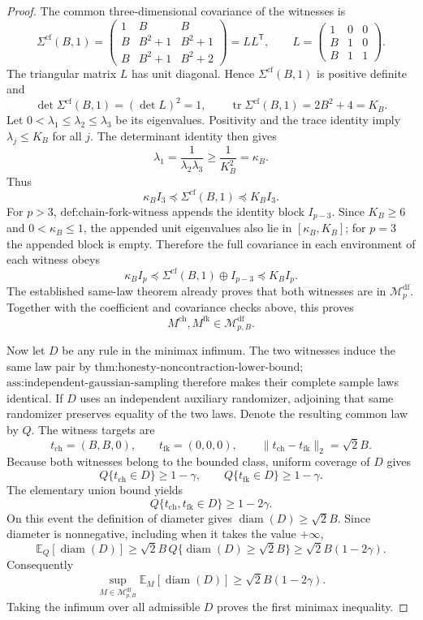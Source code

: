 \documentclass{article}
\begin{document}
\begin{proof}
The common three-dimensional covariance of the witnesses is
\[
\Sigma^{\mathrm{cf}}(B,1)
=
\begin{pmatrix}
1&B&B\\
B&B^2+1&B^2+1\\
B&B^2+1&B^2+2
\end{pmatrix}
=LL^{\mathsf T},
\qquad
L=
\begin{pmatrix}
1&0&0\\
B&1&0\\
B&1&1
\end{pmatrix}.
\]
The triangular matrix \(L\) has unit diagonal.  Hence \(\Sigma^{\mathrm{cf}}(B,1)\) is positive definite and
\[
\det\Sigma^{\mathrm{cf}}(B,1)=(\det L)^2=1,
\qquad
\operatorname{tr}\Sigma^{\mathrm{cf}}(B,1)=2B^2+4=K_B.
\]
Let \(0<\lambda_1\le\lambda_2\le\lambda_3\) be its eigenvalues.  Positivity and the trace identity imply \(\lambda_j\le K_B\) for all \(j\).  The determinant identity then gives
\[
\lambda_1=\frac{1}{\lambda_2\lambda_3}
\ge\frac{1}{K_B^2}=\kappa_B.
\]
Thus
\[
\kappa_B I_3\preceq\Sigma^{\mathrm{cf}}(B,1)
\preceq K_B I_3.
\]
For \(p>3\), \(\text{def:chain-fork-witness}\) appends the identity block \(I_{p-3}\).  Since \(K_B\ge6\) and \(0<\kappa_B\le1\), the appended unit eigenvalues also lie in \([\kappa_B,K_B]\); for \(p=3\) the appended block is empty.  Therefore the full covariance in each environment of each witness obeys
\[
\kappa_B I_p\preceq
\Sigma^{\mathrm{cf}}(B,1)\oplus I_{p-3}
\preceq K_B I_p.
\]
The established same-law theorem already proves that both witnesses are in \(\mathcal M_p^{\mathrm{df}}\).  Together with the coefficient and covariance checks above, this proves
\[
M^{\mathrm{ch}},M^{\mathrm{fk}}
\in\mathcal M_{p,B}^{\mathrm{df}}.
\]

Now let \(D\) be any rule in the minimax infimum.  The two witnesses induce the same law pair by \(\text{thm:honesty-noncontraction-lower-bound}\); \(\text{ass:independent-gaussian-sampling}\) therefore makes their complete sample laws identical.  If \(D\) uses an independent auxiliary randomizer, adjoining that same randomizer preserves equality of the two laws.  Denote the resulting common law by \(Q\).  The witness targets are
\[
t_{\mathrm{ch}}=(B,B,0),
\qquad
t_{\mathrm{fk}}=(0,0,0),
\qquad
\|t_{\mathrm{ch}}-t_{\mathrm{fk}}\|_2=\sqrt2 B.
\]
Because both witnesses belong to the bounded class, uniform coverage of \(D\) gives
\[
Q\{t_{\mathrm{ch}}\in D\}\ge1-\gamma,
\qquad
Q\{t_{\mathrm{fk}}\in D\}\ge1-\gamma.
\]
The elementary union bound yields
\[
Q\{t_{\mathrm{ch}},t_{\mathrm{fk}}\in D\}
\ge1-2\gamma.
\]
On this event the definition of diameter gives \(\operatorname{diam}(D)\ge\sqrt2 B\).  Since diameter is nonnegative, including when it takes the value \(+\infty\),
\[
\mathbb E_Q[\operatorname{diam}(D)]
\ge \sqrt2 B\,
Q\{\operatorname{diam}(D)\ge\sqrt2 B\}
\ge\sqrt2 B(1-2\gamma).
\]
Consequently
\[
\sup_{M\in\mathcal M_{p,B}^{\mathrm{df}}}
\mathbb E_M[\operatorname{diam}(D)]
\ge\sqrt2 B(1-2\gamma).
\]
Taking the infimum over all admissible \(D\) proves the first minimax inequality.


\end{proof}
\end{document}
